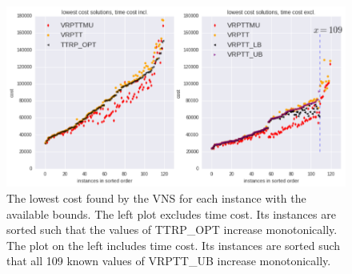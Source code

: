  \begin{figure}[!h]
     \centerline{\includegraphics[width=1.3\textwidth]{img/results_1fig.png}}
   \caption{
   The lowest cost found by the VNS for each instance with the available bounds.
   The left plot excludes time cost.
   Its instances are sorted such that the values of TTRP\_OPT increase monotonically.
   The plot on the left includes time cost.
   Its instances are sorted such that all 109 known values of VRPTT\_UB increase monotonically. }
   \label{fig:single_unload}
 \end{figure}


